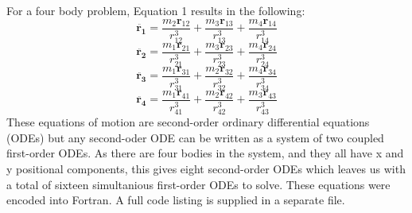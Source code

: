 \documentclass[a4paper,12pt]{article}
\begin{document}
For a four body problem, Equation 1 results in the following:
\begin{equation}
\ddot{\mathbf{r_1}}=\frac{m_2\mathbf{r}_{12}}{r^3_{12}}+\frac{m_3\mathbf{r}_{13}}{r^3_{13}}+\frac{m_4\mathbf{r}_{14}}{r^3_{14}}
\end{equation}
\begin{equation}
\ddot{\mathbf{r_2}}=\frac{m_1\mathbf{r}_{21}}{r^3_{21}}+\frac{m_3\mathbf{r}_{23}}{r^3_{23}}+\frac{m_4\mathbf{r}_{24}}{r^3_{24}}
\end{equation}
\begin{equation}
\ddot{\mathbf{r_3}}=\frac{m_1\mathbf{r}_{31}}{r^3_{31}}+\frac{m_2\mathbf{r}_{32}}{r^3_{32}}+\frac{m_4\mathbf{r}_{34}}{r^3_{34}}
\end{equation}
\begin{equation}
\ddot{\mathbf{r_4}}=\frac{m_1\mathbf{r}_{41}}{r^3_{41}}+\frac{m_2\mathbf{r}_{42}}{r^3_{42}}+\frac{m_3\mathbf{r}_{43}}{r^3_{43}}
\end{equation}
These equations of motion are second-order ordinary differential equations (ODEs) but any second-oder ODE can be written as a system
of two coupled first-order ODEs. As there are four bodies in the system, and they all have x and y positional components, this gives eight second-order 
ODEs which leaves us with a total of sixteen simultanious first-order ODEs to solve.
These equations were encoded into Fortran. 
A full code listing is supplied in a separate file.
\end{document}
